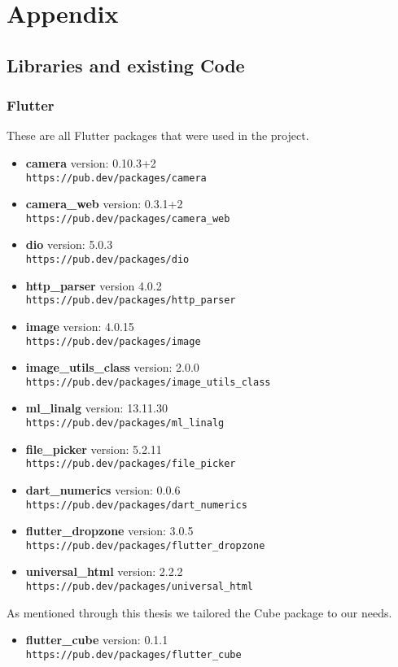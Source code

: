 \chapter{Appendix}

\section{Libraries and existing Code}

\subsection{Flutter}
These are all Flutter packages that were used in the project.
\begin{itemize}
    \item \textbf{camera} version: 0.10.3+2 \\\texttt{https://pub.dev/packages/camera} 
    \item \textbf{camera\_web} version: 0.3.1+2 \\\texttt{https://pub.dev/packages/camera\_web} 
    \item \textbf{dio} version: 5.0.3 \\\texttt{https://pub.dev/packages/dio}
    \item \textbf{http\_parser} version 4.0.2 \\\texttt{https://pub.dev/packages/http\_parser}
    \item \textbf{image} version: 4.0.15 \\\texttt{https://pub.dev/packages/image}
    \item \textbf{image\_utils\_class} version: 2.0.0 \\\texttt{https://pub.dev/packages/image\_utils\_class}
    \item \textbf{ml\_linalg} version: 13.11.30 \\\texttt{https://pub.dev/packages/ml\_linalg}
    \item \textbf{file\_picker} version: 5.2.11 \\\texttt{https://pub.dev/packages/file\_picker}
    \item \textbf{dart\_numerics} version: 0.0.6 \\\texttt{https://pub.dev/packages/dart\_numerics}
    \item \textbf{flutter\_dropzone} version: 3.0.5 \\\texttt{https://pub.dev/packages/flutter\_dropzone}
    \item \textbf{universal\_html} version: 2.2.2 \\\texttt{https://pub.dev/packages/universal\_html}
\end{itemize}
As mentioned through this thesis we tailored the Cube package to our needs.
\begin{itemize}
    \item \textbf{flutter\_cube} version: 0.1.1 \\\texttt{https://pub.dev/packages/flutter\_cube}
\end{itemize}

